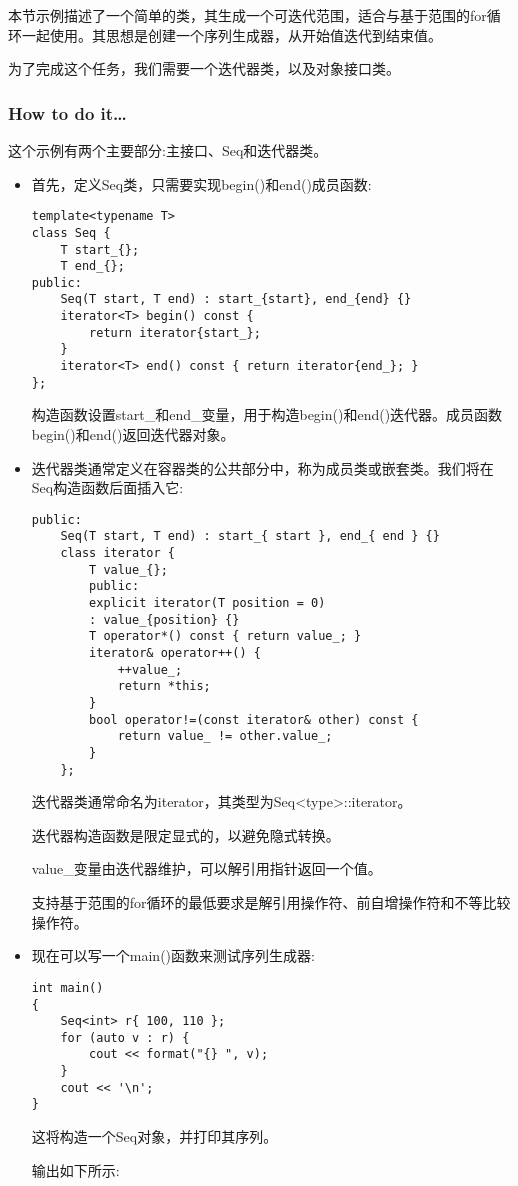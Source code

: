 
本节示例描述了一个简单的类，其生成一个可迭代范围，适合与基于范围的for循环一起使用。其思想是创建一个序列生成器，从开始值迭代到结束值。

为了完成这个任务，我们需要一个迭代器类，以及对象接口类。

\subsubsection{How to do it…}

这个示例有两个主要部分:主接口、Seq和迭代器类。

\begin{itemize}
\item 
首先，定义Seq类，只需要实现begin()和end()成员函数:

\begin{lstlisting}[style=styleCXX]
template<typename T>
class Seq {
	T start_{};
	T end_{};
public:
	Seq(T start, T end) : start_{start}, end_{end} {}
	iterator<T> begin() const {
		return iterator{start_};
	}
	iterator<T> end() const { return iterator{end_}; }
};
\end{lstlisting}

构造函数设置start\_和end\_变量，用于构造begin()和end()迭代器。成员函数begin()和end()返回迭代器对象。

\item 
迭代器类通常定义在容器类的公共部分中，称为成员类或嵌套类。我们将在Seq构造函数后面插入它:

\begin{lstlisting}[style=styleCXX]
public:
	Seq(T start, T end) : start_{ start }, end_{ end } {}
	class iterator {
		T value_{};
		public:
		explicit iterator(T position = 0)
		: value_{position} {}
		T operator*() const { return value_; }
		iterator& operator++() {
			++value_;
			return *this;
		}
		bool operator!=(const iterator& other) const {
			return value_ != other.value_;
		}
	};
\end{lstlisting}

迭代器类通常命名为iterator，其类型为Seq<type>::iterator。

迭代器构造函数是限定显式的，以避免隐式转换。

value\_变量由迭代器维护，可以解引用指针返回一个值。

支持基于范围的for循环的最低要求是解引用操作符、前自增操作符和不等比较操作符。

\item 
现在可以写一个main()函数来测试序列生成器:

\begin{lstlisting}[style=styleCXX]
int main()
{
	Seq<int> r{ 100, 110 };
	for (auto v : r) {
		cout << format("{} ", v);
	}
	cout << '\n';
}
\end{lstlisting}

这将构造一个Seq对象，并打印其序列。

输出如下所示:


\end{itemize}

